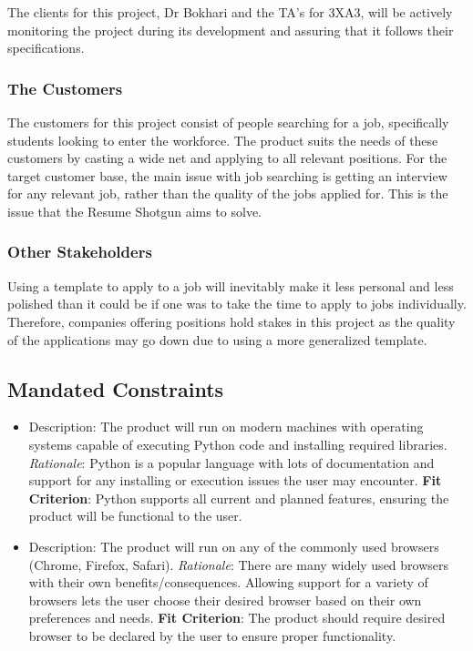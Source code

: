 \documentclass[12pt, titlepage]{article}
\begin{document}
The clients for this project, Dr Bokhari and the TA's for 3XA3, will be actively monitoring the project during its development and assuring that it follows their specifications. 

\subsubsection{The Customers}

The customers for this project consist of people searching for a job, specifically students looking to enter the workforce. The product suits the needs of these customers by casting a wide net and applying to all relevant positions. For the target customer base, the main issue with job searching is getting an interview for any relevant job, rather than the quality of the jobs applied for.  This is the issue that the Resume Shotgun aims to solve. 

\subsubsection{Other Stakeholders}

Using a template to apply to a job will inevitably make it less personal and less polished than it could be if one was to take the time to apply to jobs individually. Therefore, companies offering positions hold stakes in this project as the quality of the applications may go down due to using a more generalized template.

\subsection{Mandated Constraints}

\begin{itemize}
    \item Description: The product will run on modern machines with operating systems capable of executing Python code and installing required libraries.
	{\newline \emph{Rationale}: Python is a popular language with lots of documentation and support for any installing or execution issues the user may encounter.
	\newline \textbf{Fit Criterion}: Python supports all current and planned features, ensuring the product will be functional to the user.}
	
	\item Description: The product will run on any of the commonly used browsers (Chrome, Firefox, Safari).
	{\newline \emph{Rationale}: There are many widely used browsers with their own benefits/consequences. Allowing support for a variety of browsers lets the user choose their desired browser based on their own preferences and needs.
	\newline \textbf{Fit Criterion}: The product should require desired browser to be declared by the user to ensure proper functionality.}
\end{itemize}
\end{document}
